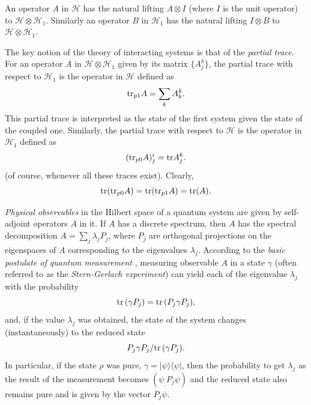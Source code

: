 \documentclass[12pt]{article}
\def\HC{\mathcal{H}}
\def\tr{\rm{tr}}
\def\ga{\gamma}
\newcommand{\la}{\lambda}
\begin{document}
An operator $A$ in $\HC$ has the natural lifting $A\otimes I$ (where $I$ is the unit operator) to $\HC\otimes \HC_1$.
Similarly an operator $B$ in $\HC_1$ has the natural lifting $I\otimes B$ to $\HC\otimes \HC_1$.

The key notion of the theory of interacting systems is that of the {\it partial trace}. For an operator
$A$ in $\HC \otimes \HC_1$ given by its matrix $\{A^k_j\}$, the partial trace with respect to $\HC_1$
is the operator in $\HC$ defined as
 \begin{equation}
 \label{eqdefparttr}
 {\tr}_{p1} A=\sum_k A^k_k.
 \end{equation}
This  partial trace is interpreted as the state of the first system given the state of the coupled one.
 Similarly, the partial trace with respect to $\HC$ is the operator
 in $\HC_1$ defined as
 \[
 ({\tr}_{p0} A)^i_j={\tr} A^k_j.
 \]
 (of course, whenever all these traces exist).
 Clearly,
 \[
 {\tr} ({\tr}_{p0} A)= {\tr} ({\tr}_{p1} A)= {\tr} (A).
 \]

{\it Physical observables} in the Hilbert space of a quantum system are
given by self-adjoint operators $A$ in it. If $A$ has a discrete spectrum,
then $A$ has the spectral decomposition $A=\sum_j \la_j P_j$, where
 $P_j$ are orthogonal projections on the eigenspaces of $A$ corresponding to
 the eigenvalues $\la_j$. According to the {\it basic postulate of quantum measurement}
 , measuring observable $A$ in a state $\ga$
(often referred to as the {\it Stern-Gerlach experiment})
can yield each of the eigenvalue $\la_j$ with the probability
   \begin{equation}
\label{eqantiunitdress1}
{\tr} \, (\ga P_j)={\tr} \, (P_j \ga P_j),
\end{equation}
 and, if the value $\la_j$ was obtained, the state
of the system changes (instantaneously) to the reduced state
\[
P_j\ga P_j/ {\tr} \, (\ga P_j).
\]
In particular, if the state $\rho$ was pure, $\ga=|\psi\rangle \langle \psi|$, then the
probability to get $\la_j$ as the result of the measurement becomes $(\psi_,P_j\psi)$
and the reduced state also remains pure and is given by the vector $P_j\psi$.
\end{document}
